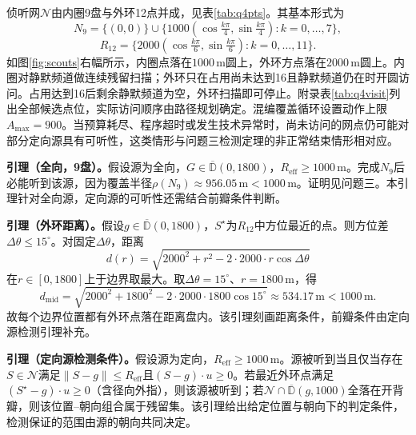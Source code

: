 \documentclass{cumcmthesis}
\begin{document}
侦听网$\mathcal{N}$由内圈9盘与外环12点并成，见表\ref{tab:q4pts}。其基本形式为
\begin{equation}
N_9=\bigl\{(0,0)\bigr\}\cup\bigl\{1000(\cos\tfrac{k\pi}{4},\sin\tfrac{k\pi}{4}):k=0,\ldots,7\bigr\},
\label{eq:q4n9}
\end{equation}
\begin{equation}
R_{12}=\bigl\{2000(\cos\tfrac{k\pi}{6},\sin\tfrac{k\pi}{6}):k=0,\ldots,11\bigr\}.
\label{eq:q4r12}
\end{equation}
如图\ref{fig:scouts}右幅所示，内圈点落在$1000\,\mathrm{m}$圆上，外环方点落在$2000\,\mathrm{m}$圆上。内圈对静默频道做连续残留扫描；外环只在占用尚未达到16且静默频道仍在时开圆访问。占用达到16后剩余静默频道为空，外环扫描即可停止。附录表\ref{tab:q4visit}列出全部候选点位，实际访问顺序由路径规划确定。混编覆盖循环设置动作上限$A_{\max}=900$。当预算耗尽、程序超时或发生技术异常时，尚未访问的网点仍可能对部分定向源具有可听性，这类情形与问题三检测定理的非正常结束情形相对应。

\textbf{引理（全向，9盘）。}假设源为全向，$G\in\overline{\mathbb{D}}(0,1800)$，$R_{\mathrm{eff}}\ge 1000\,\mathrm{m}$。完成$N_9$后必能听到该源，因为覆盖半径$\rho(N_9)\approx 956.05\,\mathrm{m}<1000\,\mathrm{m}$。证明见问题三。本引理针对全向源，定向源的可听性还需结合前瓣条件判断。

\textbf{引理（外环距离）。}假设$g\in\overline{\mathbb{D}}(0,1800)$，$S^\star$为$R_{12}$中方位最近的点。则方位差$\Delta\theta\le 15^\circ$。对固定$\Delta\theta$，距离
\begin{equation}
d(r)=\sqrt{2000^2+r^2-2\cdot 2000\cdot r\cos\Delta\theta}
\label{eq:q4dmid}
\end{equation}
在$r\in[0,1800]$上于边界取最大。取$\Delta\theta=15^\circ$、$r=1800\,\mathrm{m}$，得
\begin{equation}
d_{\mathrm{mid}}=\sqrt{2000^2+1800^2-2\cdot 2000\cdot 1800\cos 15^\circ}\approx 534.17\,\mathrm{m}<1000\,\mathrm{m}.
\label{eq:q4mid}
\end{equation}
故每个边界位置都有外环点落在距离盘内。该引理刻画距离条件，前瓣条件由定向源检测引理补充。

\textbf{引理（定向源检测条件）。}假设源为定向，$R_{\mathrm{eff}}\ge 1000\,\mathrm{m}$。源被听到当且仅当存在$S\in\mathcal{N}$满足$\|S-g\|\le R_{\mathrm{eff}}$且$(S-g)\cdot u\ge 0$。若最近外环点满足$(S^\star-g)\cdot u\ge 0$（含径向外指），则该源被听到；若$\mathcal{N}\cap\overline{\mathbb{D}}(g,1000)$全落在开背瓣，则该位置--朝向组合属于残留集。该引理给出给定位置与朝向下的判定条件，检测保证的范围由源的朝向共同决定。
\end{document}
